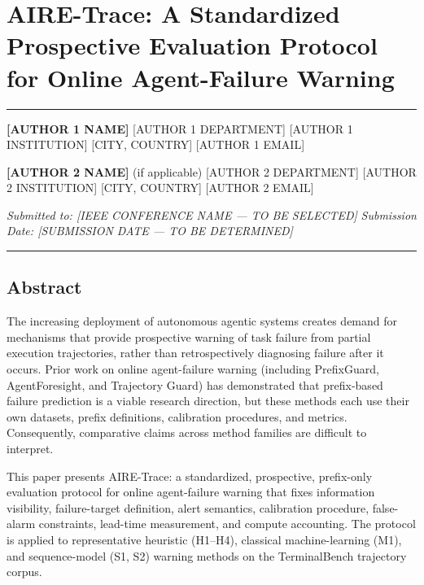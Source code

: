 \documentclass[
]{article}
\author{}
\date{}
\begin{document}
\section{AIRE-Trace: A Standardized Prospective Evaluation Protocol for
Online Agent-Failure
Warning}\label{aire-trace-a-standardized-prospective-evaluation-protocol-for-online-agent-failure-warning}

\begin{center}\rule{0.5\linewidth}{0.5pt}\end{center}

\textbf{{[}AUTHOR 1 NAME{]}} {[}AUTHOR 1 DEPARTMENT{]} {[}AUTHOR 1
INSTITUTION{]} {[}CITY, COUNTRY{]} {[}AUTHOR 1 EMAIL{]}

\textbf{{[}AUTHOR 2 NAME{]}} (if applicable) {[}AUTHOR 2 DEPARTMENT{]}
{[}AUTHOR 2 INSTITUTION{]} {[}CITY, COUNTRY{]} {[}AUTHOR 2 EMAIL{]}

\emph{Submitted to: {[}IEEE CONFERENCE NAME --- TO BE SELECTED{]}}
\emph{Submission Date: {[}SUBMISSION DATE --- TO BE DETERMINED{]}}

\begin{center}\rule{0.5\linewidth}{0.5pt}\end{center}

\subsection{Abstract}\label{abstract}

The increasing deployment of autonomous agentic systems creates demand
for mechanisms that provide prospective warning of task failure from
partial execution trajectories, rather than retrospectively diagnosing
failure after it occurs. Prior work on online agent-failure warning
(including PrefixGuard, AgentForesight, and Trajectory Guard) has
demonstrated that prefix-based failure prediction is a viable research
direction, but these methods each use their own datasets, prefix
definitions, calibration procedures, and metrics. Consequently,
comparative claims across method families are difficult to interpret.

This paper presents AIRE-Trace: a standardized, prospective, prefix-only
evaluation protocol for online agent-failure warning that fixes
information visibility, failure-target definition, alert semantics,
calibration procedure, false-alarm constraints, lead-time measurement,
and compute accounting. The protocol is applied to representative
heuristic (H1--H4), classical machine-learning (M1), and sequence-model
(S1, S2) warning methods on the TerminalBench trajectory corpus.
\end{document}
